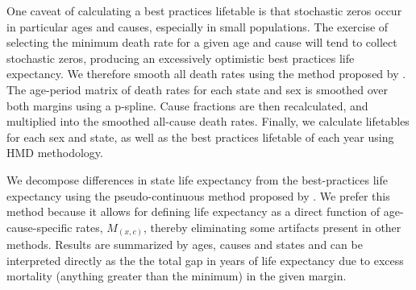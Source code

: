\documentclass[11pt,oneside,a4paper]{article} %
\begin{document}

One caveat of calculating a best practices lifetable is that stochastic zeros
occur in particular ages and causes, especially in small populations. The
exercise of selecting the minimum death rate for a given age and cause will tend
to collect stochastic zeros, producing an excessively optimistic best practices
life expectancy. We therefore smooth all death rates using
the method proposed by \citep{GC2012}. The age-period
matrix of death rates for each state and sex is smoothed over both margins
using a p-spline. Cause fractions are then recalculated, and
multiplied into the smoothed all-cause death rates. Finally, we calculate
lifetables for each sex and state, as well as the best practices lifetable of
each year using HMD methodology.

We decompose differences in state life expectancy from the best-practices life
expectancy using the pseudo-continuous method proposed by
\citet{horiuchi2008decomposition}. We prefer this method because it allows for
defining life expectancy as a direct function of age-cause-specific rates,
$M_{(x,c)}$, thereby eliminating some artifacts present in other methods.
Results are summarized by ages, causes and states and can be interpreted
directly as the the total gap in years of life expectancy due to excess
mortality (anything greater than the minimum) in the given margin.
\end{document}
